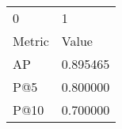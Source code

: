 \begin{tabular}{ll}
0 & 1 \\
Metric & Value \\
AP & 0.895465 \\
P@5 & 0.800000 \\
P@10 & 0.700000 \\
\end{tabular}
